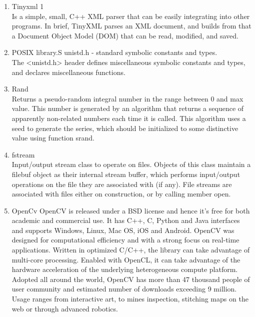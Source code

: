 \documentclass[twocolumn]{IEEEtran}
\begin{document}
\begin{enumerate}
         \item Tinyxml 1 \\
         Is a simple, small, C++ XML parser that can be easily integrating into other programs. In 
         brief, TinyXML parses an XML document, and builds from that a Document Object Model (DOM) that 
         can be read, modified, and saved.\\
         
         \item POSIX library.S unistd.h - standard symbolic constants and types.\\
         The <unistd.h> header defines miscellaneous symbolic constants and types, and declares 
         miscellaneous functions.\\
            
         \item Rand \\
         Returns a pseudo-random integral number in the range between 0 and max value. This number is 
         generated by an algorithm that returns a sequence of apparently non-related numbers each time 
         it is called. This algorithm uses a seed to generate the series, which should be initialized 
         to some distinctive value using function srand.\\
            
         \item fstream \\
         Input/output stream class to operate on files. Objects of this class maintain a filebuf object 
         as their internal stream buffer, which performs input/output operations on the file they are 
         associated with (if any). File streams are associated with files either on construction, or by 
         calling member open.\\
         
         \item OpenCv
         OpenCV is released under a BSD license and hence it’s free for both academic and commercial 
         use. It has C++, C, Python and Java interfaces and supports Windows, Linux, Mac OS, iOS and 
         Android. OpenCV was designed for computational efficiency and with a strong focus on real-time 
         applications. Written in optimized C/C++, the library can take advantage of multi-core 
         processing. Enabled with OpenCL, it can take advantage of the hardware acceleration of the 
         underlying heterogeneous compute platform. Adopted all around the world, OpenCV has more than 
         47 thousand people of user community and estimated number of downloads exceeding 9 million. 
         Usage ranges from interactive art, to mines inspection, stitching maps on the web or through 
         advanced robotics.

	\end{enumerate}
\end{document}
